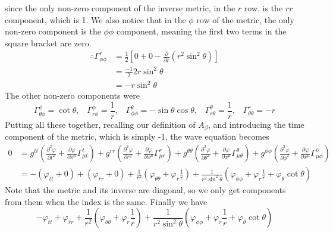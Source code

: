 \documentclass[11pt]{article}
\numberwithin{equation}{section}
\numberwithin{figure}{section}
\numberwithin{table}{section}
\begin{document}
since the only non-zero component of the inverse metric, in the $r$ row, is the $rr$ component, which is 1. We also notice that in the $\phi$ row of the metric, the only non-zero component is the $\phi\phi$ component, meaning the first two terms in the square bracket are zero.
\begin{align*}
    \therefore\Gamma^r_{\phi\phi}&=\frac{1}{2}[0+0-\frac{\partial}{\partial r}(r^2\sin^2\theta)]\\
    &=\frac{-1}{2}2r\sin^2\theta\\
    &=-r\sin^2\theta
\end{align*}
The other non-zero components were 
\begin{equation*}
    \Gamma^\phi_{\theta\phi}=\cot\theta,\;\;\;\Gamma^\phi_{r\phi}=\frac{1}{r},\;\;\;\Gamma^\theta_{\phi\phi}=-\sin\theta\cos\theta,\;\;\;\Gamma^\theta_{r\theta}=\frac{1}{r},\;\;\;\Gamma^r_{\theta\theta}=-r
\end{equation*}
Putting all these together, recalling our definition of $A_\beta$, and introducing the time component of the metric, which is simply -1, the wave equation becomes
\begin{align*}
    0&=g^{tt}\left(\frac{\partial^2\varphi}{\partial t^2}+\frac{\partial\varphi}{\partial x^\mu}\Gamma^t_{\mu t}\right)+g^{rr}\left(\frac{\partial^2\varphi}{\partial r^2}+\frac{\partial\varphi}{\partial x^\mu}\Gamma^r_{\mu r}\right)+g^{\theta\theta}\left(\frac{\partial^2\varphi}{\partial \theta^2}+\frac{\partial\varphi}{\partial x^\mu}\Gamma^\theta_{\mu \theta}\right)+g^{\phi\phi}\left(\frac{\partial^2\varphi}{\partial \phi^2}+\frac{\partial\varphi}{\partial x^\mu}\Gamma^\phi_{\mu \phi}\right)\\
    &=-(\varphi_{tt}+0)+(\varphi_{rr}+0)+\frac{1}{r^2}\left(\varphi_{\theta\theta}+\varphi_r\frac{1}{r}\right)+\frac{1}{r^2\sin^2\theta}\left(\varphi_{\phi\phi}+\varphi_r\frac{1}{r}+\varphi_\theta\cot\theta\right)
\end{align*}
Note that the metric and its inverse are diagonal, so we only get components from them when the index is the same. Finally we have 
\begin{equation}
    -\varphi_{tt}+\varphi_{rr}+\frac{1}{r^2}\left(\varphi_{\theta\theta}+\varphi_r\frac{1}{r}\right)+\frac{1}{r^2\sin^2\theta}\left(\varphi_{\phi\phi}+\varphi_r\frac{1}{r}+\varphi_\theta\cot\theta\right)
    \label{eqn:wave equation spherical polars}
\end{equation}
\end{document}
